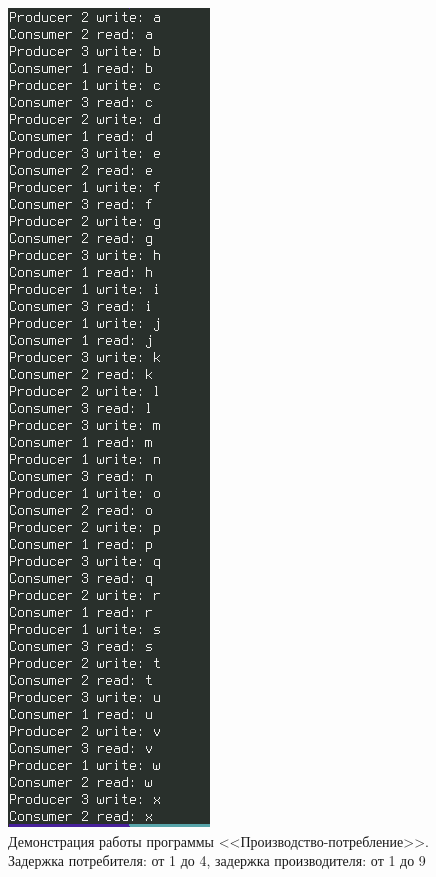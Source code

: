 \documentclass[12pt]{report}
\begin{document}
\begin{figure}[H]
	\centering
	\includegraphics[scale=0.75]{img/prod-cons-03.png}
	\caption{Демонстрация работы программы <<Производство-потребление>>. Задержка потребителя: от 1 до 4, задержка производителя: от 1 до 9}
	\label{fig:task01-03}
\end{figure}
\end{document}

